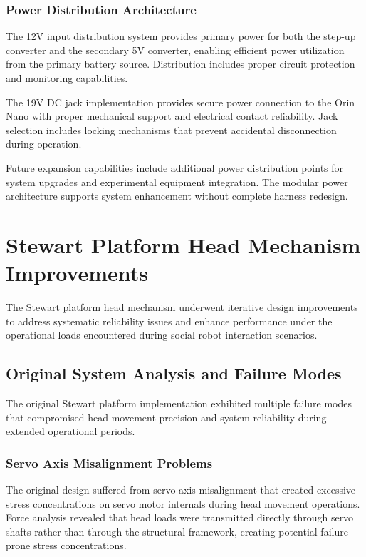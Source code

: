 \subsubsection{Power Distribution Architecture}

The 12V input distribution system provides primary power for both the step-up converter and the secondary 5V converter, enabling efficient power utilization from the primary battery source. Distribution includes proper circuit protection and monitoring capabilities.

The 19V DC jack implementation provides secure power connection to the Orin Nano with proper mechanical support and electrical contact reliability. Jack selection includes locking mechanisms that prevent accidental disconnection during operation.

Future expansion capabilities include additional power distribution points for system upgrades and experimental equipment integration. The modular power architecture supports system enhancement without complete harness redesign.

\section{Stewart Platform Head Mechanism Improvements}

The Stewart platform head mechanism underwent iterative design improvements to address systematic reliability issues and enhance performance under the operational loads encountered during social robot interaction scenarios.

\subsection{Original System Analysis and Failure Modes}

The original Stewart platform implementation exhibited multiple failure modes that compromised head movement precision and system reliability during extended operational periods.

\subsubsection{Servo Axis Misalignment Problems}

The original design suffered from servo axis misalignment that created excessive stress concentrations on servo motor internals during head movement operations. Force analysis revealed that head loads were transmitted directly through servo shafts rather than through the structural framework, creating potential failure-prone stress concentrations.


